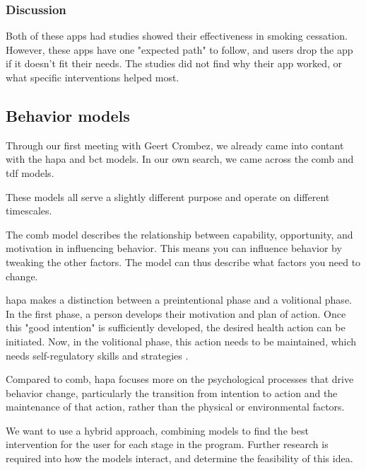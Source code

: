 \subsubsection{Discussion}

Both of these apps had studies showed their effectiveness in smoking cessation. However, these apps have one "expected path" to follow, and users drop the app if it doesn't fit their needs.
The studies did not find why their app worked, or what specific interventions helped most.




\subsection{Behavior models}


Through our first meeting with Geert Crombez, we already came into contant with the \ac{hapa} and \ac{bct} models.
In our own search, we came across the \ac{comb} and \ac{tdf} models.

These models all serve a slightly different purpose and operate on different timescales.

The \ac{comb} model \cite{communicatieCOMBModelGedrag2023} describes the relationship between capability, opportunity, and motivation in influencing behavior. This means you can influence behavior by tweaking the other factors.
The model can thus describe what factors you need to change.

\ac{hapa} \cite{schwarzerModelingHealthBehavior2008,schwarzerHealthActionProcess2016} makes a distinction between a preintentional phase and a volitional phase. In the first phase, a person develops their motivation and plan of action. Once this "good intention" is sufficiently developed, the desired health action can be initiated.
Now, in the volitional phase, this action needs to be maintained, which needs self-regulatory skills and strategies \cite{schwarzerModelingHealthBehavior2008}.

Compared to \ac{comb}, \ac{hapa} focuses more on the psychological processes that drive behavior change, particularly the transition from intention to action and the maintenance of that action, rather than the physical or environmental factors.

We want to use a hybrid approach, combining models to find the best intervention for the user for each stage in the program. Further research is required into how the models interact, and determine the feasibility of this idea.

